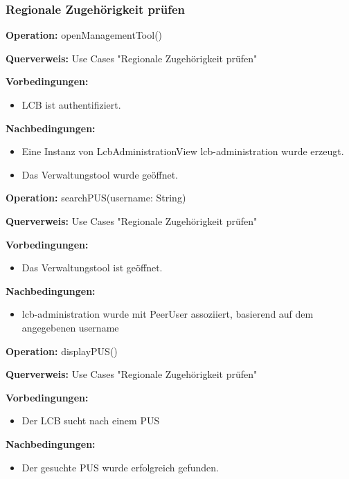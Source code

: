 \documentclass[a4paper,12pt]{article}
\begin{document}
	\subsubsection{Regionale Zugehörigkeit prüfen}
	\begin{contractbox}
		\textbf{Operation:} openManagementTool()
		
		\textbf{Querverweis:} Use Cases "Regionale Zugehörigkeit prüfen"
		
		\textbf{Vorbedingungen:}
		\begin{itemize}[noitemsep]
			\item LCB ist authentifiziert.
		\end{itemize}
		
		\textbf{Nachbedingungen:}
		\begin{itemize}[noitemsep]
			\item Eine Instanz von LcbAdministrationView lcb-administration wurde erzeugt.
			\item Das Verwaltungstool wurde geöffnet.
		\end{itemize}
	\end{contractbox}
	
	\begin{contractbox}
		\textbf{Operation:} searchPUS(username: String)
		
		\textbf{Querverweis:} Use Cases "Regionale Zugehörigkeit prüfen"
		
		\textbf{Vorbedingungen:}
		\begin{itemize}[noitemsep]
			\item Das Verwaltungstool ist geöffnet.
		\end{itemize}
		
		\textbf{Nachbedingungen:}
		\begin{itemize}[noitemsep]
			\item lcb-administration wurde mit PeerUser assoziiert,
			basierend auf dem angegebenen username
		\end{itemize}
	\end{contractbox}
	
	\begin{contractbox}
		\textbf{Operation:} displayPUS()
		
		\textbf{Querverweis:} Use Cases "Regionale Zugehörigkeit prüfen"
		
		\textbf{Vorbedingungen:}
		\begin{itemize}[noitemsep]
			\item Der LCB sucht nach einem PUS
		\end{itemize}
		
		\textbf{Nachbedingungen:}
		\begin{itemize}[noitemsep] 
			\item Der gesuchte PUS wurde erfolgreich gefunden.
		\end{itemize}
	\end{contractbox}
	
\end{document}
